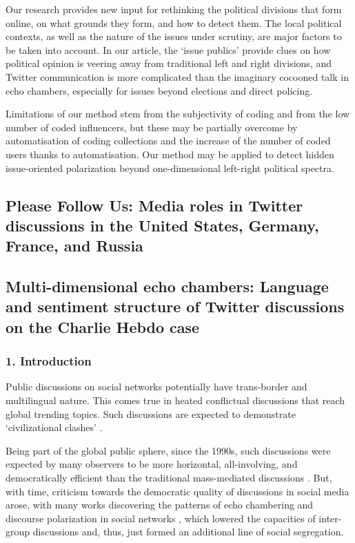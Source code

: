 Our research provides new input for rethinking the political divisions that form online, on what grounds they form, and how to detect them. The local political contexts, as well as the nature of the issues under scrutiny, are major factors to be taken into account. In our article, the ‘issue publics’ provide clues on how political opinion is veering away from traditional left and right divisions, and Twitter communication is more complicated than the imaginary cocooned talk in echo chambers, especially for issues beyond elections and direct policing.

Limitations of our method stem from the subjectivity of coding and from the low number of coded influencers, but these may be partially overcome by automatisation of coding collections and the increase of the number of coded users thanks to automatisation. Our method may be applied to detect hidden issue-oriented polarization beyond one-dimensional left-right political spectra.

\subsection{Please Follow Us: Media roles in Twitter discussions in the United States, Germany, France, and Russia}\label{subsec:ch5/sec1/sub2}

\subsection{Multi-dimensional echo chambers: Language and sentiment structure of Twitter discussions on the Charlie Hebdo case}\label{subsec:ch5/sec1/sub3}

\subsubsection{1. Introduction}

Public discussions on social networks potentially have trans-border and multilingual nature. This comes true in heated conflictual discussions that reach global trending topics. Such discussions are expected to demonstrate ‘civilizational clashes’ \cite{AnKwakMejova}.

Being part of the global public sphere, since the 1990s, such discussions were expected by many observers to be more horizontal, all-involving, and democratically efficient \cite{Fuchs} than the traditional mass-mediated discussions \cite{McQuail}. But, with time, criticism towards the democratic quality of discussions in social media arose, with many works discovering the patterns of echo chambering and discourse polarization in social networks \cite{Sunstein2001,Sunstein2002,BarberaJostNagler,BastosMerceaBaronchelli,ColleoniRozzaArvidsson,ConoverRatkiewiczFrancisco}, which lowered the capacities of inter-group discussions and, thus, just formed an additional line of social segregation.


